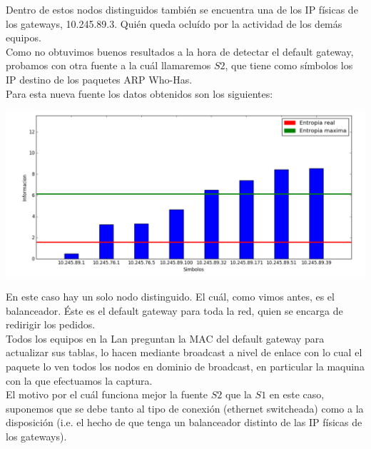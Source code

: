 Dentro de estos nodos distinguidos también se encuentra una de los IP físicas de los gateways, 10.245.89.3. Quién queda ocluído por la actividad de los demás equipos.\\

Como no obtuvimos buenos resultados a la hora de detectar el default gateway, probamos con otra fuente a la cuál llamaremos $S2$, que tiene como símbolos los IP destino de los paquetes ARP Who-Has.\\

Para esta nueva fuente los datos obtenidos son los siguientes:
\begin{center}
\includegraphics[scale=0.5]{imagenes/analisisTCORPcableada/fuenteS1-12.png} 
\end{center}

En este caso hay un solo nodo distinguido. El cuál, como vimos antes, es el balanceador. Éste es el default gateway para toda la red, quien se encarga de redirigir los pedidos.\\

Todos los equipos en la Lan preguntan la MAC del default gateway para actualizar sus tablas, lo hacen mediante broadcast a nivel de enlace con lo cual el paquete lo ven todos los nodos en dominio de broadcast, en particular la maquina con la que efectuamos la captura.\\

El motivo por el cuál funciona mejor la fuente $S2$ que la $S1$ en este caso, suponemos que se debe tanto al tipo de conexión (ethernet switcheada) como a la disposición (i.e. el hecho de que tenga un balanceador distinto de las IP físicas de los gateways).


